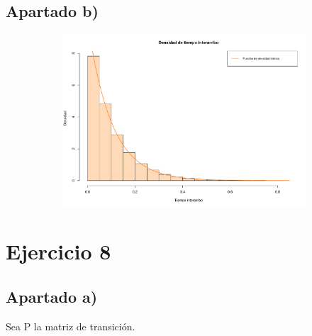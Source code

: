 \documentclass[11pt]{article}
\begin{document}

\subsection*{Apartado b)}

\begin{figure}[h!]
  \begin{center}
    \begin{subfigure}[b]{\linewidth}
      \includegraphics[width=\linewidth]{densidadTiempoInterarribo.pdf}
    \end{subfigure}
  \end{center}
\end{figure}



\section{Ejercicio 8}

\subsection*{Apartado a)}

Sea P la matriz de transición.
\end{document}
